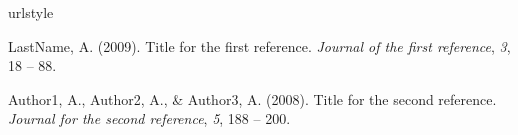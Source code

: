 \documentclass[12pt]{article}
\begin{document}

\begin{thebibliography}{100}
\providecommand{\natexlab}[1]{#1}
\expandafter\ifx\csname urlstyle\endcsname\relax
  \providecommand{\doi}[1]{doi:\discretionary{}{}{}#1}\else
  \providecommand{\doi}{doi:\discretionary{}{}{}\begingroup
  \urlstyle{rm}\Url}\fi

LastName, A. (2009).
\newblock Title for the first reference.
\newblock \emph{Journal of the first reference}, \emph{3}, 18 -- 88.


Author1, A., Author2, A., \& Author3, A. (2008).
\newblock Title for the second reference.
\newblock \emph{Journal for the second reference}, \emph{5}, 188 -- 200.

\end{thebibliography}
\end{document}
